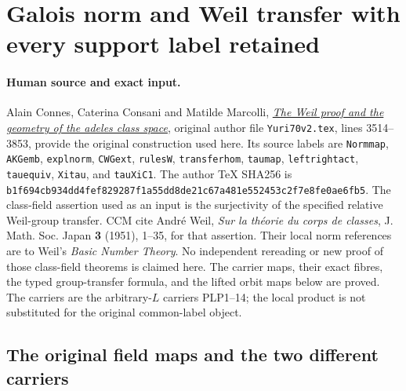 \section{Galois norm and Weil transfer with every support label retained}
\label{sec:cc-galois-transfer-full-lattice}

\paragraph{Human source and exact input.}
Alain Connes, Caterina Consani and Matilde Marcolli,
\href{https://arxiv.org/abs/math/0703392v1}{\emph{The Weil proof and the
geometry of the adeles class space}}, original author file
\nolinkurl{Yuri70v2.tex}, lines 3514--3853, provide the original
construction used here. Its source labels are
\texttt{Normmap}, \texttt{AKGemb}, \texttt{explnorm},
\texttt{CWGext}, \texttt{rulesW}, \texttt{transferhom},
\texttt{taumap}, \texttt{leftrightact}, \texttt{tauequiv},
\texttt{Xitau}, and \texttt{tauXiC1}.
The author TeX SHA256 is
\texttt{b1f694cb934dd4fe\allowbreak{}f829287f1a55dd8d\allowbreak{}e21c67a481e55245\allowbreak{}3c2f7e8fe0ae6fb5}.
The class-field assertion used as an input is the surjectivity of
the specified relative Weil-group transfer. CCM cite Andr\'e Weil,
\emph{Sur la th\'eorie du corps de classes}, J. Math. Soc. Japan
\textbf{3} (1951), 1--35, for that assertion. Their local norm
references are to Weil's \emph{Basic Number Theory}.
No independent rereading or new proof of those class-field theorems
is claimed here. The carrier maps, their exact fibres, the typed
group-transfer formula, and the lifted orbit maps below are proved.
The carriers are the arbitrary-$L$ carriers PLP1--14; the local
product is not substituted for the original common-label object.

\subsection{The original field maps and the two different carriers}

